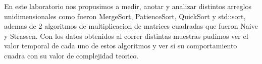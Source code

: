 En este laboratorio nos propusimos a medir, anotar y analizar distintos arreglos unidimensionales como fueron MergeSort, PatienceSort, QuickSort y std::sort, ademas de 2 algoritmos de multiplicacion de matrices cuadradas que fueron Naive y Strassen. Con los datos obtenidos al correr distintas muestras pudimos ver el valor temporal de cada uno de estos algoritmos y ver si su comportamiento cuadra con su valor de complejidad teorico.